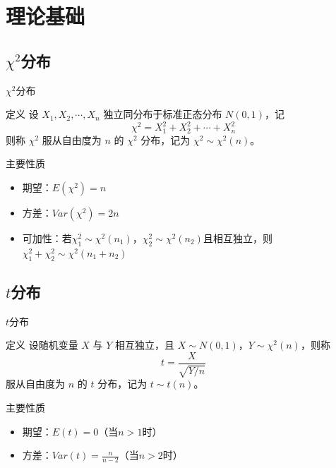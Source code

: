 \documentclass{beamer}
\begin{document}

\section{理论基础}

\subsection{\(\chi^2\)分布}
\begin{frame}{\(\chi^2\)分布}
    \begin{block}{定义}
        设 \(X_1, X_2, \cdots, X_n\) 独立同分布于标准正态分布 \(N(0, 1)\)，记
        \[\chi^2 = X_1^2 + X_2^2 + \cdots + X_n^2\]
        则称 \(\chi^2\) 服从自由度为 \(n\) 的 \(\chi^2\) 分布，记为 \(\chi^2 \sim \chi^2(n)\)。
    \end{block}

    \vspace{0.3cm}

    \begin{block}{主要性质}
        \begin{itemize}
            \item 期望：\(E(\chi^2) = n\)
            \item 方差：\(Var(\chi^2) = 2n\)
            \item 可加性：若\(\chi_1^2 \sim \chi^2(n_1)\)，\(\chi_2^2 \sim \chi^2(n_2)\)且相互独立，则\(\chi_1^2 + \chi_2^2 \sim \chi^2(n_1+n_2)\)
        \end{itemize}
    \end{block}
\end{frame}

\subsection{\(t\)分布}
\begin{frame}{\(t\)分布}
    \begin{block}{定义}
        设随机变量 \(X\) 与 \(Y\) 相互独立，且 \(X \sim N(0,1)\)，\(Y \sim \chi^2(n)\)，则称
        \[t = \frac{X}{\sqrt{Y/n}}\]
        服从自由度为 \(n\) 的 \(t\) 分布，记为 \(t \sim t(n)\)。
    \end{block}

    \vspace{0.3cm}

    \begin{block}{主要性质}
        \begin{itemize}
            \item 期望：\(E(t) = 0\)（当\(n>1\)时）
            \item 方差：\(Var(t) = \frac{n}{n-2}\)（当\(n>2\)时）
        \end{itemize}
    \end{block}
\end{frame}
\end{document}
